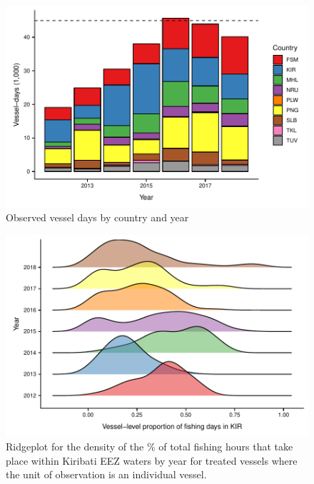 \documentclass[9p,twocolumn,twoside,lineno]{pnas-new}
\begin{document}
\begin{figure}
\centering
	\includegraphics{img/all_PS_VDS_cty_year.pdf}
	\caption{\label{fig:all_PS_VDS_cty_year}Observed vessel days by country and year}
\end{figure}

\clearpage

\begin{figure}
\centering
	\includegraphics{img/hist_kir_fishing.pdf}
	\caption{\label{fig:hist_kir_fishing}Ridgeplot for the density of the \% of total fishing hours that take place within Kiribati EEZ waters by year for treated vessels where the unit of observation is an individual vessel.}
\end{figure}

\clearpage
\end{document}
